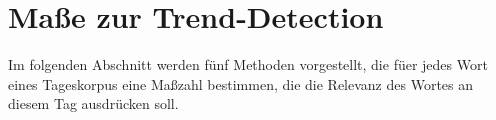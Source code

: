 
\chapter{Maße zur Trend-Detection}
Im folgenden Abschnitt werden fünf Methoden vorgestellt, die f\"uer jedes Wort eines Tageskorpus eine Maßzahl bestimmen, die die Relevanz des Wortes an diesem Tag ausdrücken soll.






